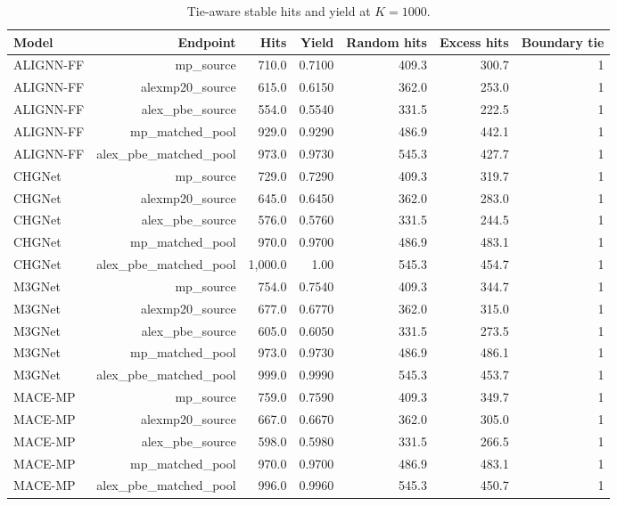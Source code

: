 \begin{table}[H]
\centering
\sitablefont
\caption{Tie-aware stable hits and yield at $K=1000$.}
\label{tab:v3-top1000}
\begin{adjustbox}{max width=\linewidth}
\begin{tabular}{@{}lrrrrrr@{}}
\toprule
Model & Endpoint & Hits & Yield & Random hits & Excess hits & Boundary tie \\
\midrule
ALIGNN-FF & mp\_source & 710.0 & 0.7100 & 409.3 & 300.7 & 1 \\
ALIGNN-FF & alexmp20\_source & 615.0 & 0.6150 & 362.0 & 253.0 & 1 \\
ALIGNN-FF & alex\_pbe\_source & 554.0 & 0.5540 & 331.5 & 222.5 & 1 \\
ALIGNN-FF & mp\_matched\_pool & 929.0 & 0.9290 & 486.9 & 442.1 & 1 \\
ALIGNN-FF & alex\_pbe\_matched\_pool & 973.0 & 0.9730 & 545.3 & 427.7 & 1 \\
CHGNet & mp\_source & 729.0 & 0.7290 & 409.3 & 319.7 & 1 \\
CHGNet & alexmp20\_source & 645.0 & 0.6450 & 362.0 & 283.0 & 1 \\
CHGNet & alex\_pbe\_source & 576.0 & 0.5760 & 331.5 & 244.5 & 1 \\
CHGNet & mp\_matched\_pool & 970.0 & 0.9700 & 486.9 & 483.1 & 1 \\
CHGNet & alex\_pbe\_matched\_pool & 1,000.0 & 1.00 & 545.3 & 454.7 & 1 \\
M3GNet & mp\_source & 754.0 & 0.7540 & 409.3 & 344.7 & 1 \\
M3GNet & alexmp20\_source & 677.0 & 0.6770 & 362.0 & 315.0 & 1 \\
M3GNet & alex\_pbe\_source & 605.0 & 0.6050 & 331.5 & 273.5 & 1 \\
M3GNet & mp\_matched\_pool & 973.0 & 0.9730 & 486.9 & 486.1 & 1 \\
M3GNet & alex\_pbe\_matched\_pool & 999.0 & 0.9990 & 545.3 & 453.7 & 1 \\
MACE-MP & mp\_source & 759.0 & 0.7590 & 409.3 & 349.7 & 1 \\
MACE-MP & alexmp20\_source & 667.0 & 0.6670 & 362.0 & 305.0 & 1 \\
MACE-MP & alex\_pbe\_source & 598.0 & 0.5980 & 331.5 & 266.5 & 1 \\
MACE-MP & mp\_matched\_pool & 970.0 & 0.9700 & 486.9 & 483.1 & 1 \\
MACE-MP & alex\_pbe\_matched\_pool & 996.0 & 0.9960 & 545.3 & 450.7 & 1 \\
\bottomrule
\end{tabular}
\end{adjustbox}
\end{table}


